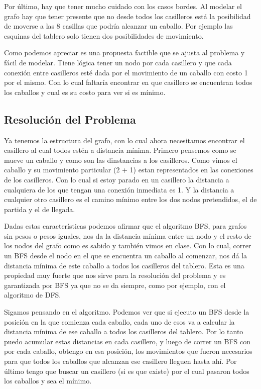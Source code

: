 Por \'ultimo, hay que tener mucho cuidado con los casos bordes. Al modelar el grafo hay que tener presente que no desde todos los casilleros est\'a la posibilidad de moverse a las 8 casillas que podr\'ia alcanzar un caballo. Por ejemplo las esquinas del tablero solo tienen dos posibilidades de movimiento.

Como podemos apreciar es una propuesta factible que se ajusta al problema y f\'acil de modelar. Tiene l\'ogica tener un nodo por cada casillero y que cada conexi\'on entre casilleros est\'e dada por el movimiento de un caballo con costo 1 por el mismo. Con lo cual faltar\'ia encontrar en que casillero se encuentran todos los caballos y cual es su costo para ver si es m\'inimo.


\subsection{Resoluci\'on del Problema}

Ya tenemos la estructura del grafo, con lo cual ahora necesitamos encontrar el casillero al cual todos est\'en a distancia m\'inima.
Primero pensemos como se mueve un caballo y como son las dinstancias a los casilleros.
Como vimos el caballo y su movimiento particular (2 + 1) estan representados en las conexiones de los casilleros. Con lo cual si estoy parado en un casillero la distancia a cualquiera de los que tengan una conexi\'on inmediata es 1. Y la distancia a cualquier otro casillero es el camino m\'inimo entre los dos nodos pretendidos, el de partida y el de llegada.

Dadas estas caracter\'isticas podemos afirmar que el algoritmo BFS, para grafos sin pesos o pesos iguales, nos da la distancia m\'inima entre un nodo y el resto de los nodos del grafo como es sabido y tambi\'en vimos en clase. Con lo cual, correr un BFS desde el nodo en el que se encuentra un caballo al comenzar, nos d\'a la distancia m\'inima de este caballo a todos los casilleros del tablero. Esta es una propiedad muy fuerte que nos sirve para la resoluci\'on del problema y es garantizada por BFS ya que no se da siempre, como por ejemplo, con el algoritmo de DFS.

Sigamos pensando en el algoritmo. Podemos ver que si ejecuto un BFS desde la posici\'on en la que comienza cada caballo, cada uno de esos va a calcular la distancia m\'inima de ese caballo a todos los casilleros del tablero. Por lo tanto puedo acumular estas distancias en cada casillero, y luego de correr un BFS con por cada caballo, obtengo en esa posici\'on, los movimientos que fueron necesarios para que todos los caballos que alcanzan ese casillero lleguen hasta ah\'i. Por \'ultimo tengo que buscar un casillero (si es que existe) por el cual pasaron todos los caballos y sea el m\'inimo.
